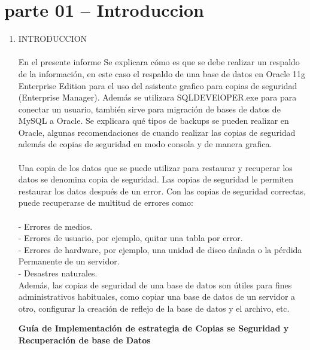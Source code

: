 \section{parte 01 – Introduccion} 

\begin{enumerate}[1.]
	\item INTRODUCCION\\
	\\En el presente informe Se explicara cómo es que se debe realizar un respaldo de la información, en este caso el respaldo de una base de datos en Oracle 11g Enterprise Edition para el uso del asistente grafico para copias de seguridad (Enterprise Manager).
Además se utilizara SQLDEVElOPER.exe para para conectar un usuario, también sirve para migración de bases de datos de MySQL a Oracle.
Se explicara qué tipos de backups se pueden realizar en Oracle, algunas recomendaciones de cuando realizar las copias de seguridad además de copias de seguridad en modo consola y de manera grafica.
\\
\\Una copia de los datos que se puede utilizar para restaurar y recuperar los datos se denomina copia de seguridad. Las copias de seguridad le permiten restaurar los datos después de un error. Con las copias de seguridad correctas, puede recuperarse de multitud de errores como:\\
\\
-  Errores de medios.\\
-  Errores de usuario, por ejemplo, quitar una tabla por error.\\
- Errores de hardware, por ejemplo, una unidad de disco dañada o la pérdida Permanente de un servidor.\\
- Desastres naturales.\\

Además, las copias de seguridad de una base de datos son útiles para fines administrativos habituales, como copiar una base de datos de un servidor a otro, configurar la creación de reflejo de la base de datos y el archivo, etc.
\\

\vspace*{0.8in}
\begin{Large}
\textbf{Guía de Implementación de estrategia de Copias se Seguridad y Recuperación de base de Datos} \\
\end{Large}



	
	

\end{enumerate} 
